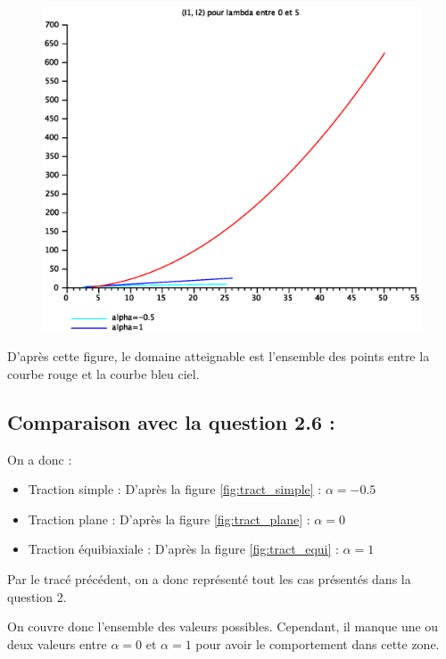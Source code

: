\documentclass[a4paper,11pt]{article}
\begin{document}
\begin{figure}[!ht]
\centering\includegraphics[scale=0.5]{scilab/q5-1.eps}
\label{fig:5.1}
\end{figure}

D'après cette figure, le domaine atteignable est l'ensemble des points entre la courbe rouge et la courbe bleu ciel.

\subsection{Comparaison avec la question 2.6 :}
On a donc :
\begin{itemize}
\item Traction simple :
D'après la figure \ref{fig:tract_simple} :  $\alpha = -0.5$
\item Traction plane :
D'après la figure \ref{fig:tract_plane} :  $\alpha = 0$
\item Traction équibiaxiale :
D'après la figure \ref{fig:tract_equi} : $\alpha = 1$
\end{itemize}
Par le tracé précédent, on a donc représenté tout les cas présentés dans la question 2.

On couvre donc l'ensemble des valeurs possibles. Cependant, il manque une ou deux valeurs entre $\alpha = 0$ et $\alpha = 1$ pour avoir le comportement dans cette zone.
\end{document}
